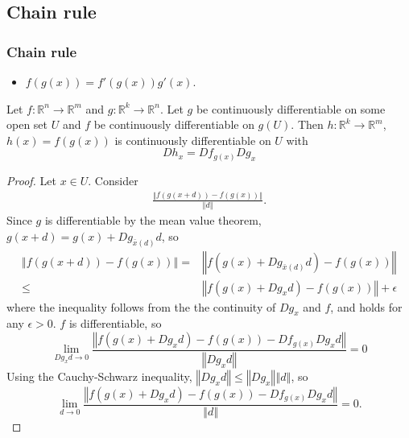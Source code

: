 \documentclass[compress]{beamer}
\def\R{\mathbb{R}}
\newcommand{\norm}[1]{\left\Vert {#1} \right\Vert}
\renewcommand{\to}{{\rightarrow}}
\begin{document}
\subsection{Chain rule}

\begin{frame}\frametitle{Chain rule}
  \begin{itemize}
  \item $f(g(x)) = f'(g(x)) g'(x)$. 
  \end{itemize}
  \begin{theorem} \label{thm:chain}
    Let $f:\R^n \to \R^m$ and $g: \R^k \to \R^n$. Let $g$ be
    continuously differentiable on some open set $U$ and $f$ be
    continuously differentiable on $g(U)$. Then $h:\R^k \to \R^m$, $h
    (x) = f(g(x))$ is continuously differentiable on $U$ with 
    \[ Dh_x = D f_{g(x)} D g_x \]
  \end{theorem}
\end{frame}

\begin{frame}
  \begin{proof}
    Let $x \in U$. Consider
    \begin{align*}
      \frac{\norm{ f(g(x+d)) - f(g(x))}} {\norm{d}}.
    \end{align*}
    Since $g$ is differentiable by the mean value theorem, $g(x+d) =
    g(x) + Dg_{\bar{x}(d)} d$, so
    \begin{align*}
      \norm{ f(g(x+d)) - f(g(x))} = &  
      \norm{ f(g(x) + D g_{\bar{x}(d)} d ) - f(g(x))} \\
      \leq & \norm{f(g(x) + D g_x d) - f(g(x))} + \epsilon
    \end{align*}
  where the inequality follows from the the continuity of $D g_x$ and
  $f$, and holds for any $\epsilon >0$. $f$ is differentiable, so
  \[ \lim_{D g_x d \to 0} \frac{\norm{f(g(x) + D g_x d) -
      f(g(x)) - D f_{g(x)} D g_x d}} {\norm{D g_x d}} = 0 \]
  Using the Cauchy-Schwarz inequality, $\norm{D g_x d} \leq \norm{D
    g_x} \norm{d}$, so
  \[ \lim_{ d \to 0} \frac{\norm{f(g(x) + D g_x d) -
      f(g(x)) - D f_{g(x)} D g_x d}} {\norm{d}} = 0. \]   
\end{proof}
\end{frame}
\end{document}
